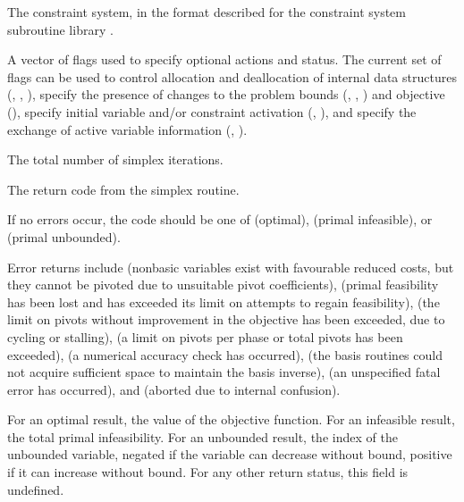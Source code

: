 \begin{codedoc}
  \item{}
  The constraint system, in the format described for the \consys constraint
  system subroutine library \cite{Haf98b}.

  \item{}
  A vector of flags used to specify optional actions and status.
  The current set of flags can be used to control allocation and deallocation
  of internal \dylp data structures
  (, , ),
  specify the presence of changes to the problem bounds
  (, , )
  and objective (),
  specify initial variable and/or constraint activation
  (, ),
  and specify the exchange of active variable information
  (, ).

  \item{}
  The total number of simplex iterations.

  \item{}
  The return code from the simplex routine.
  
  If no errors occur, the code should be one of  (optimal),
   (primal infeasible), or 
  (primal unbounded).

  Error returns include
   (nonbasic variables exist with favourable reduced costs, but
  they cannot be pivoted due to unsuitable pivot coefficients),
   (primal feasibility has been lost and \dylp has
  exceeded its limit on attempts to regain feasibility),
   (the limit on pivots without improvement in the objective
  has been exceeded, due to cycling or stalling),
   (a limit on pivots per phase or total pivots has been
  exceeded),
   (a numerical accuracy check has occurred),
   (the \glpk basis routines could not acquire sufficient
  space to maintain the basis inverse),
   (an unspecified fatal error has occurred), and
   (\dylp aborted due to internal confusion).

  \item{}
  For an optimal result, the value of the objective function.
  For an infeasible result, the total primal infeasibility.
  For an unbounded result, the index of the unbounded variable, negated
  if the variable can decrease without bound, positive if it can increase
  without bound.
  For any other return status, this field is undefined.


\end{codedoc}
